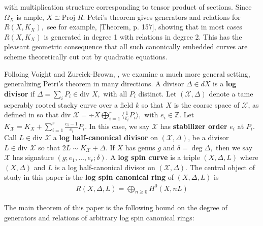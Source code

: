 \documentclass{amsart}
\theoremstyle{plain}
\theoremstyle{definition}
\theoremstyle{remark}
\numberwithin{equation}{section}
\newcommand\BZ{{\mathbb Z}}
\newcommand \sx{\mathscr X}
\newcommand \proj{\text{Proj }}
\newcommand \di{\text{div }}
\newcommand \halfcan{L}
\begin{document}
\noindent
with multiplication structure corresponding to tensor product of sections. Since $\Omega_X$ is ample, $X \cong \proj R$. Petri's theorem gives generators and relations for $R(X,K_X),$ see for example, \cite{saint-donat:proj}[Theorem, p. 157], showing that in most cases $R(X,K_X)$ is generated in degree 1 with relations in degree 2. This has the pleasant geometric consequence that all such canonically embedded curves are scheme theoretically cut out by quadratic equations.

Folloing Voight and Zureick-Brown, \cite{vzb:stacky}, we examine a much more general setting, generalizing Petri's theorem in many directions.
A divisor $\Delta \in d X$ is a {\bf log divisor} if $\Delta = \sum_{i}^{}P_i \in \di X,$ with all $P_i$ distinct. Let $(\sx,\Delta)$ denote a tame seperably rooted stacky curve over a field $k$ so that $X$ is the coarse space of $\sx$, as defined in \cite[Section 5.2]{vzb:stacky} so that $\di \sx = \div X \bigoplus_{i=1}^r \langle \frac{1}{e_i}P_i \rangle,$ with $e_i \in \BZ$. Let $K_\sx = K_X + \sum_{i=1}^{r}\frac{e_i-1}{e_i}P_i.$ In this case, we say $\sx$ has {\bf stabilizer order} $e_i$ at $P_i$. Call $\halfcan \in \di \sx$ a {\bf log half-canonical divisor} on $(\sx,\Delta)$, be a divisor $\halfcan \in \di \sx$ so that $2\halfcan \sim K_\sx + \Delta.$ If $X$ has genus $g$ and $\delta = \deg \Delta,$ then we say $\sx$ has signature $(g; e_1, \ldots, e_r;\delta)$. A {\bf log spin curve} is a triple $(X,\Delta,\halfcan)$ where $(X,\Delta)$ and $\halfcan$ is a log half-canonical divisor on $(\sx,\Delta)$. The central object of study in this paper is the {\bf log spin canonical ring} of $(X,\Delta,L)$ is
\begin{align*}
	R(X,\Delta,L) = \bigoplus_{n \geq 0} H^0(X,nL)
\end{align*}

\noindent
The main theorem of this paper is the following bound on the degree of generators and relations of arbitrary log spin canonical rings:
\end{document}
